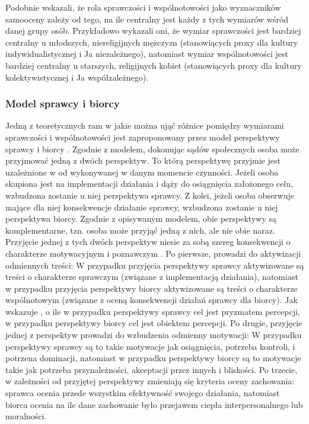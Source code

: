 \documentclass[man]{apa6}
\begin{document}
Podobnie \textcite{gebauer2013agency} wskazali, że rola sprawczości i wspólnotowości jako wyznaczników samooceny zależy od tego, na ile centralny jest każdy z tych wymiarów wśród danej grupy osób. Przykładowo wykazali oni, że wymiar sprawczości jest bardziej centralny u młodszych, niereligijnych mężczyzn (stanowiących proxy dla kultury indywidualistycznej i Ja niezależnego), natomiast wymiar wspólnotowości jest bardziej centralny u starszych, religijnych kobiet (stanowiących proxy dla kultury kolektywistycznej i Ja współzależnego).\\

\subsubsection{Model sprawcy i biorcy \parencite{wojciszke2006perspektywa}}

Jedną z teoretycznych ram w jakie można ująć różnice pomiędzy wymiarami sprawczości i wspólnotowości jest zaproponowany przez \textcite{wojciszke2006perspektywa} model perspektywy sprawcy i biorcy \parencite[w ostatnich opracowaniach określany również jako model perspektywy aktora i obserwatora,][]{abele2014communal}. Zgodnie z modelem, dokonując sądów społecznych osoba może przyjmować jedną z dwóch perspektyw. To którą perspektywę przyjmie jest uzależnione w od wykonywanej w danym momencie czynności. Jeżeli osoba skupiona jest na implementacji działania i dąży do osiągnięcia założonego celu, wzbudzona zostanie u niej perspektywa sprawcy. Z kolei, jeżeli osoba obserwuje mające dla niej konsekwencje działanie sprawcy, wzbudzona zostanie u niej perspektywa biorcy. Zgodnie z opisywanym modelem, obie perspektywy są komplementarne, tzn. osoba może przyjąć jedną z nich, ale nie obie naraz.\\

Przyjęcie jednej z tych dwóch perspektyw niesie za sobą szereg konsekwencji o charakterze motywacyjnym i poznawczym \parencite[patrz,][]{wojciszke2010sprawczosc}. Po pierwsze, prowadzi do aktywizacji odmiennych treści: W przypadku przyjęcia perspektywy sprawcy aktywizowane są treści o charakterze sprawczym (związane z implementacją działania), natomiast w przypadku przyjęcia perspektywy biorcy aktywizowane są treści o charakterze wspólnotowym (związane z oceną konsekwencji działań sprawcy dla biorcy). Jak wskazuje \textcite{wojciszke2010sprawczosc}, o ile w przypadku perspektywy sprawcy cel jest pryzmatem percepcji, w przypadku perspektywy biorcy cel jest obiektem percepcji. Po drugie, przyjęcie jednej z perspektyw prowadzi do wzbudzenia odmienny motywacji: W przypadku perspektywy sprawcy są to takie motywacje jak osiągnięcia, potrzeba kontroli, i potrzena dominacji, natomiast w przypadku perspektywy biorcy są to motywacje takie jak potrzeba przynależności, akceptacji przez innych i bliskości. Po trzecie, w zależności od przyjętej perspektywy zmieniają się kryteria oceny zachowania: sprawca ocenia przede wszystkim efektywność swojego działania, natomiast biorca ocenia na ile dane zachowanie było przejawem ciepła interpersonalnego lub moralności.\\
\end{document}
